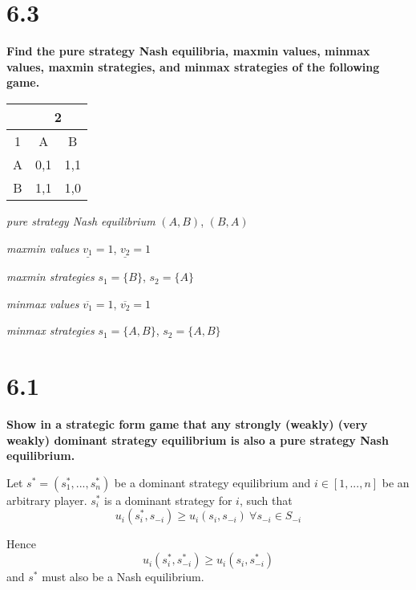 \section*{6.3}

\textbf{Find the pure strategy Nash equilibria, maxmin values, minmax values, maxmin strategies, and minmax strategies of the following game.}

\begin{table}[H]
    \centering
    \begin{tabular}{|c|c|c|} \hline
          & \multicolumn{2}{|c|}{2} \\ \hline
        1 & A & B \\ \hline
        A & 0,1 & 1,1 \\ \hline
        B & 1,1 & 1,0 \\ \hline
    \end{tabular}
\end{table}

\textit{pure strategy Nash equilibrium} $(A,B)$, $(B,A)$

\textit{maxmin values} $\underline{v_1}=1$, $\underline{v_2}=1$

\textit{maxmin strategies} $s_1=\{B\}$, $s_2=\{A\}$

\textit{minmax values} $\overline{v_1}=1$, $\overline{v_2}=1$

\textit{minmax strategies} $s_1=\{A, B\}$, $s_2=\{A,B\}$


\section*{6.1}

\textbf{Show in a strategic form game that any strongly (weakly) (very weakly) dominant strategy equilibrium is also a pure strategy Nash equilibrium.}

Let $s^* = (s_1^*, ..., s_n^*)$ be a dominant strategy equilibrium and $i\in [1,...,n]$ be an arbitrary player. $s_i^*$ is a dominant strategy for $i$, such that
\[ u_i(s_i^*, s_{-i}) \geq u_i(s_i,s_{-i})\ \forall s_{-i}\in S_{-i} \]

Hence
\[ u_i(s_i^*, s_{-i}^*) \geq u_i(s_i, s_{-i}^*) \]
and $s^*$ must also be a Nash equilibrium.